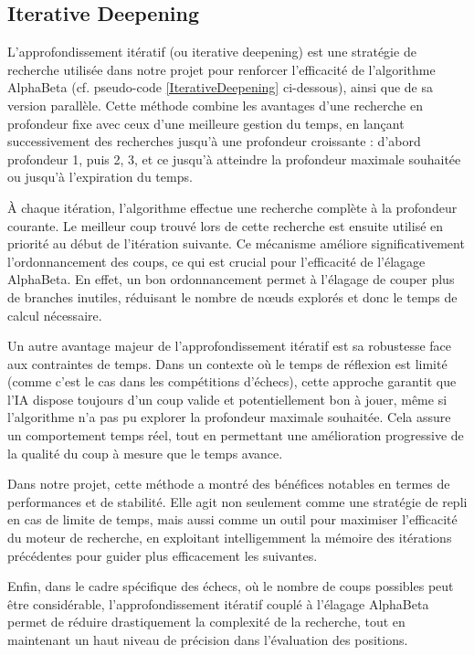 \documentclass{article}
\begin{document}
\subsection{Iterative Deepening}

L'approfondissement itératif (ou iterative deepening) est une stratégie de recherche utilisée dans notre projet pour renforcer l'efficacité de l'algorithme AlphaBeta (cf. pseudo-code \ref{IterativeDeepening} ci-dessous), ainsi que de sa version parallèle. Cette méthode combine les avantages d'une recherche en profondeur fixe avec ceux d'une meilleure gestion du temps, en lançant successivement des recherches jusqu'à une profondeur croissante : d'abord profondeur 1, puis 2, 3, et ce jusqu'à atteindre la profondeur maximale souhaitée ou jusqu'à l'expiration du temps.

À chaque itération, l'algorithme effectue une recherche complète à la profondeur courante. Le meilleur coup trouvé lors de cette recherche est ensuite utilisé en priorité au début de l'itération suivante. Ce mécanisme améliore significativement l'ordonnancement des coups, ce qui est crucial pour l'efficacité de l'élagage AlphaBeta. En effet, un bon ordonnancement permet à l'élagage de couper plus de branches inutiles, réduisant le nombre de nœuds explorés et donc le temps de calcul nécessaire.

Un autre avantage majeur de l'approfondissement itératif est sa robustesse face aux contraintes de temps. Dans un contexte où le temps de réflexion est limité (comme c'est le cas dans les compétitions d'échecs), cette approche garantit que l'IA dispose toujours d'un coup valide et potentiellement bon à jouer, même si l'algorithme n'a pas pu explorer la profondeur maximale souhaitée. Cela assure un comportement temps réel, tout en permettant une amélioration progressive de la qualité du coup à mesure que le temps avance.

Dans notre projet, cette méthode a montré des bénéfices notables en termes de performances et de stabilité. Elle agit non seulement comme une stratégie de repli en cas de limite de temps, mais aussi comme un outil pour maximiser l'efficacité du moteur de recherche, en exploitant intelligemment la mémoire des itérations précédentes pour guider plus efficacement les suivantes.

Enfin, dans le cadre spécifique des échecs, où le nombre de coups possibles peut être considérable, l'approfondissement itératif couplé à l'élagage AlphaBeta permet de réduire drastiquement la complexité de la recherche, tout en maintenant un haut niveau de précision dans l'évaluation des positions.
\end{document}

